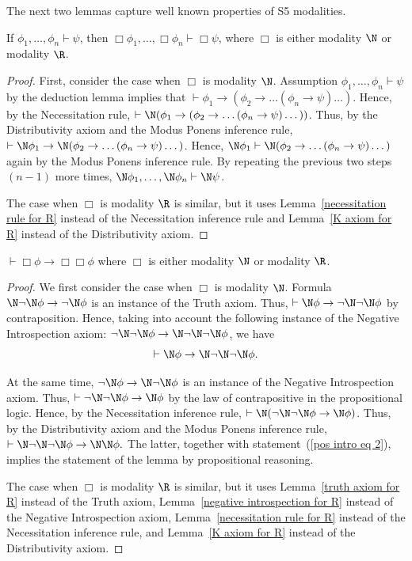 \documentclass[letterpaper]{article}
\begin{document}
The next two lemmas capture well known properties of S5 modalities. %

\begin{lemma}\label{superdistributivity}
If $\phi_1,\dots,\phi_n\vdash \psi$, then $\Box\phi_1,\dots,\Box\phi_n\vdash \Box\psi$, where $\Box$ is either modality $\N$ or modality $\R$.
\end{lemma}
\begin{proof}
First, consider the case when $\Box$ is modality $\N$. Assumption $\phi_1,\dots,\phi_n\vdash \psi$ by the deduction lemma implies that
$\vdash\phi_1\to(\phi_2\to\dots(\phi_n\to \psi)\dots)$. Hence, by the Necessitation rule, 
$\vdash\N(\phi_1\to(\phi_2\to\dots(\phi_n\to \psi)\dots))$.
Thus, by the Distributivity axiom and the Modus Ponens inference rule,
$\vdash\N\phi_1\to\N(\phi_2\to\dots(\phi_n\to \psi)\dots)$.
Hence, 
$\N\phi_1\vdash\N(\phi_2\to\dots(\phi_n\to \psi)\dots)$
again by the Modus Ponens inference rule.
By repeating the previous two steps $(n-1)$ more times,
$\N\phi_1,\dots,\N\phi_n\vdash \N\psi$.

The case when $\Box$ is modality $\R$ is similar, but it uses Lemma~\ref{necessitation rule for R} instead of the Necessitation inference rule and Lemma~\ref{K axiom for R} instead of the Distributivity axiom.
\end{proof}


\begin{lemma}\label{positive introspection lemma}
$\vdash\Box\phi\to\Box\Box\phi$ where $\Box$ is either modality $\N$ or modality $\R$. 
\end{lemma}
\begin{proof}
We first consider the case when $\Box$ is modality $\N$. 
Formula $\N\neg\N\phi\to\neg\N\phi$ is an instance of the Truth axiom. Thus, $\vdash \N\phi\to\neg\N\neg\N\phi$ by contraposition. Hence, taking into account the following instance of  the Negative Introspection axiom: $\neg\N\neg\N\phi\to\N\neg\N\neg\N\phi$,
we have 
\begin{equation}\label{pos intro eq 2}
\vdash \N\phi\to\N\neg\N\neg\N\phi.
\end{equation}

At the same time, $\neg\N\phi\to\N\neg\N\phi$ is an instance of the Negative Introspection axiom. Thus, $\vdash \neg\N\neg\N\phi\to \N\phi$ by the law of contrapositive in the propositional logic. Hence, by the Necessitation inference rule, 
$\vdash \N(\neg\N\neg\N\phi\to \N\phi)$. Thus, by  the Distributivity axiom and the Modus Ponens inference rule, 
$
  \vdash \N\neg\N\neg\N\phi\to \N\N\phi.
$
 The latter, together with statement~(\ref{pos intro eq 2}), implies the statement of the lemma by propositional reasoning.
 
The case when $\Box$ is modality $\R$ is similar, but it uses Lemma~\ref{truth axiom for R} instead of the Truth axiom, Lemma~\ref{negative introspection for R} instead of the Negative Introspection axiom, Lemma~\ref{necessitation rule for R} instead of the Necessitation inference rule, and Lemma~\ref{K axiom for R} instead of the Distributivity axiom. 
\end{proof}
\end{document}
